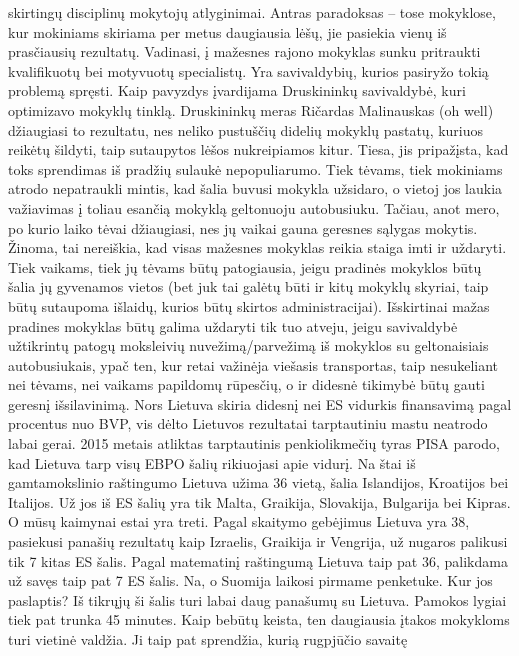 \documentclass[]{article}
\begin{document}
skirtingų disciplinų mokytojų atlyginimai. Antras paradoksas -- tose
mokyklose, kur mokiniams skiriama per metus daugiausia lėšų, jie
pasiekia vienų iš prasčiausių rezultatų. Vadinasi, į mažesnes rajono
mokyklas sunku pritraukti kvalifikuotų bei motyvuotų specialistų. Yra
savivaldybių, kurios pasiryžo tokią problemą spręsti. Kaip pavyzdys
įvardijama Druskininkų savivaldybė, kuri optimizavo mokyklų tinklą.
Druskininkų meras Ričardas Malinauskas (oh well) džiaugiasi to
rezultatu, nes neliko pustuščių didelių mokyklų pastatų, kuriuos reikėtų
šildyti, taip sutaupytos lėšos nukreipiamos kitur. Tiesa, jis
pripažįsta, kad toks sprendimas iš pradžių sulaukė nepopuliarumo. Tiek
tėvams, tiek mokiniams atrodo nepatraukli mintis, kad šalia buvusi
mokykla užsidaro, o vietoj jos laukia važiavimas į toliau esančią
mokyklą geltonuoju autobusiuku. Tačiau, anot mero, po kurio laiko tėvai
džiaugiasi, nes jų vaikai gauna geresnes sąlygas mokytis. Žinoma, tai
nereiškia, kad visas mažesnes mokyklas reikia staiga imti ir uždaryti.
Tiek vaikams, tiek jų tėvams būtų patogiausia, jeigu pradinės mokyklos
būtų šalia jų gyvenamos vietos (bet juk tai galėtų būti ir kitų mokyklų
skyriai, taip būtų sutaupoma išlaidų, kurios būtų skirtos
administracijai). Išskirtinai mažas pradines mokyklas būtų galima
uždaryti tik tuo atveju, jeigu savivaldybė užtikrintų patogų moksleivių
nuvežimą/parvežimą iš mokyklos su geltonaisiais autobusiukais, ypač ten,
kur retai važinėja viešasis transportas, taip nesukeliant nei tėvams,
nei vaikams papildomų rūpesčių, o ir didesnė tikimybė būtų gauti geresnį
išsilavinimą. Nors Lietuva skiria didesnį nei ES vidurkis finansavimą
pagal procentus nuo BVP, vis dėlto Lietuvos rezultatai tarptautiniu
mastu neatrodo labai gerai. 2015 metais atliktas tarptautinis
penkiolikmečių tyras PISA parodo, kad Lietuva tarp visų EBPO šalių
rikiuojasi apie vidurį. Na štai iš gamtamokslinio raštingumo Lietuva
užima 36 vietą, šalia Islandijos, Kroatijos bei Italijos. Už jos iš ES
šalių yra tik Malta, Graikija, Slovakija, Bulgarija bei Kipras. O mūsų
kaimynai estai yra treti. Pagal skaitymo gebėjimus Lietuva yra 38,
pasiekusi panašių rezultatų kaip Izraelis, Graikija ir Vengrija, už
nugaros palikusi tik 7 kitas ES šalis. Pagal matematinį raštingumą
Lietuva taip pat 36, palikdama už savęs taip pat 7 ES šalis. Na, o
Suomija laikosi pirmame penketuke. Kur jos paslaptis? Iš tikrųjų ši
šalis turi labai daug panašumų su Lietuva. Pamokos lygiai tiek pat
trunka 45 minutes. Kaip bebūtų keista, ten daugiausia įtakos mokykloms
turi vietinė valdžia. Ji taip pat sprendžia, kurią rugpjūčio savaitę
\end{document}
